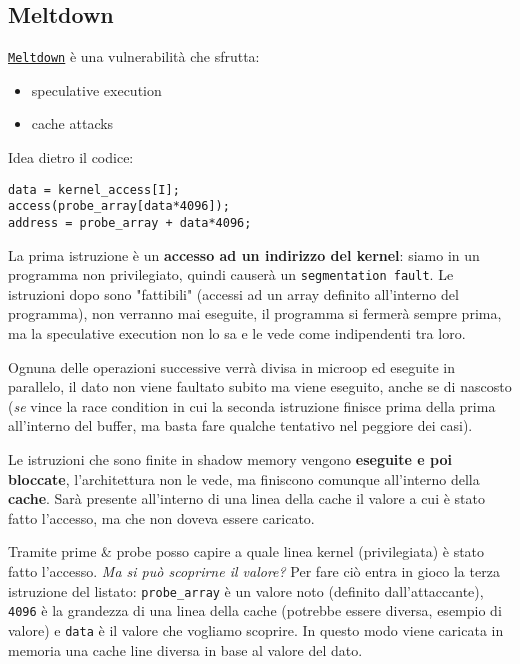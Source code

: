 \newpage

\subsection{Meltdown}

\href{https://meltdownattack.com/meltdown.pdf}{\texttt{Meltdown}} è una vulnerabilità che sfrutta:
\begin{itemize}
	\item speculative execution
	\item cache attacks
\end{itemize}

Idea dietro il codice:
\begin{verbatim}
data = kernel_access[I];
access(probe_array[data*4096]);
address = probe_array + data*4096;
\end{verbatim}

La prima istruzione è un \textbf{accesso ad un indirizzo del kernel}: siamo in un programma non privilegiato, quindi causerà un \texttt{segmentation fault}. Le istruzioni dopo sono "fattibili" (accessi ad un array definito all'interno del programma), non verranno mai eseguite, il programma si fermerà sempre prima, ma la speculative execution non lo sa e le vede come indipendenti tra loro. 

Ognuna delle operazioni successive verrà divisa in microop ed eseguite in parallelo, il dato non viene faultato subito ma viene eseguito, anche se di nascosto (\textit{se} vince la race condition in cui la seconda istruzione finisce prima della prima all'interno del buffer, ma basta fare qualche tentativo nel peggiore dei casi).

Le istruzioni che sono finite in shadow memory vengono \textbf{eseguite e poi bloccate}, l'architettura non le vede, ma finiscono comunque all'interno della \textbf{cache}. Sarà presente all'interno di una linea della cache il valore a cui è stato fatto l'accesso, ma che non doveva essere caricato.

Tramite prime \& probe posso capire a quale linea kernel (privilegiata) è stato fatto l'accesso. \textit{Ma si può scoprirne il valore?} Per fare ciò entra in gioco la terza istruzione del listato: \texttt{probe\_array} è un valore noto (definito dall'attaccante), \texttt{4096} è la grandezza di una linea della cache (potrebbe essere diversa, esempio di valore) e \texttt{data} è il valore che vogliamo scoprire. In questo modo viene caricata in memoria una cache line diversa in base al valore del dato.

